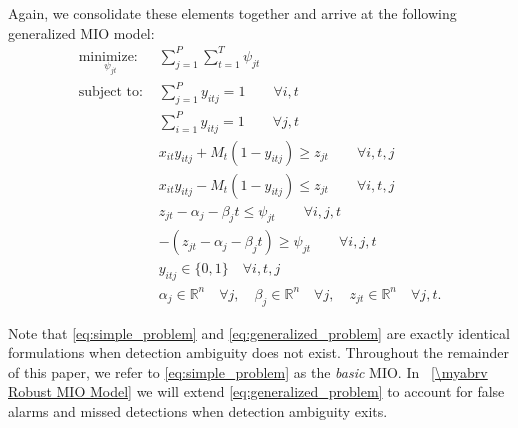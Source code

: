 Again, we consolidate these elements together and arrive at the following generalized MIO model:
\begin{align}
\underset{\psi_{jt}}{\text{minimize: }} & \sum_{j=1}^{P} \sum_{t=1}^{T} \psi_{jt} \label{eq:generalized_problem}\\
\text{subject to: }	& \sum_{j=1}^{P} y_{itj} = 1 \qquad \forall i,t\nonumber\\
				& \sum_{i=1}^{P} y_{itj} = 1 \qquad \forall j,t\nonumber\\
				& x_{it}y_{itj} + M_{t}(1-y_{itj}) \geq z_{jt} \qquad \forall i,t,j\nonumber\\
				& x_{it}y_{itj} - M_{t}(1-y_{itj}) \leq z_{jt} \qquad \forall i,t,j\nonumber\\
				& z_{jt} - \alpha_{j} - \beta_{j}t \leq \psi_{jt} \qquad \forall i,j,t\nonumber\\
				& -(z_{jt} - \alpha_{j} - \beta_{j}t) \geq \psi_{jt} \qquad \forall i,j,t\nonumber\\
			 	& y_{itj} \in \{0,1\} \quad \forall i,t,j\nonumber\\
				& \alpha_{j} \in \mathbb{R}^n \quad \forall j,\quad \beta_{j} \in \mathbb{R}^n \quad \forall j, \quad z_{jt} \in \mathbb{R}^n \quad \forall j,t.\nonumber
\end{align}

Note that \eqref{eq:simple_problem} and \eqref{eq:generalized_problem} are exactly identical formulations when detection ambiguity does not exist. Throughout the remainder of this paper, we refer to \eqref{eq:simple_problem} as the \textit{basic} MIO. In \mysection~\ref{\myabrv Robust MIO Model} we will extend \eqref{eq:generalized_problem} to account for false alarms and missed detections when detection ambiguity exits. 
